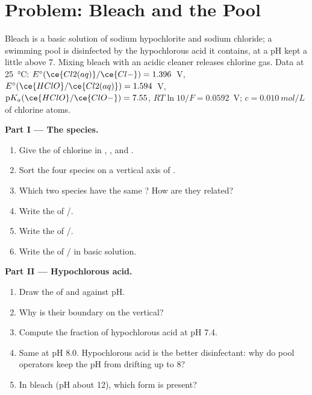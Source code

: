 \section{Problem: Bleach and the Pool}

\begin{problem}
\label{pb:b1:e-ph-diagrams:1}
Bleach is a basic solution of sodium hypochlorite and sodium chloride; a
swimming pool is disinfected by the hypochlorous acid it contains, at a
pH kept a little above 7. Mixing bleach with an acidic cleaner releases
chlorine gas. Data at \qty{25}{\celsius}: $E^\circ(\ce{Cl2(aq)}/\ce{Cl-})
= 1.396$~V, $E^\circ(\ce{HClO}/\ce{Cl2(aq)}) = 1.594$~V,
$\mathrm{p}K_a(\ce{HClO}/\ce{ClO-}) = 7.55$, $RT\ln 10/F = 0.0592$~V;
 $c = \qty{0.010}{mol/L}$ of chlorine atoms.

\medskip
\noindent\textbf{Part I --- The species.}
\begin{enumerate}
  \item Give the  of chlorine in , ,
         and .
  \item Sort the four species on a vertical axis of .
  \item Which two species have the same ? How are they
        related?
  \item Write the  of /.
  \item Write the  of /.
  \item Write the  of / in basic solution.
\end{enumerate}

\medskip
\noindent\textbf{Part II --- Hypochlorous acid.}
\begin{enumerate}[resume]
  \item Draw the  of  and  against
        pH.
  \item Why is their boundary on the  vertical?
  \item Compute the fraction of hypochlorous acid at pH 7.4.
  \item Same at pH 8.0. Hypochlorous acid is the better disinfectant: why
        do pool operators keep the pH from drifting up to 8?
  \item In bleach (pH about 12), which form is present?
\end{enumerate}


\end{problem}
